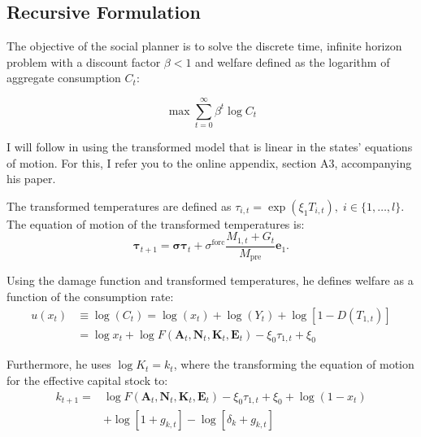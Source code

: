 \subsection{Recursive Formulation}
\label{subsec:recursive formulation}

The objective of the social planner is to solve the discrete time, infinite horizon problem with a discount factor \(\beta < 1\) and welfare defined as the logarithm of aggregate consumption \(C_t\):

\begin{equation}
    \max \sum_{t=0}^\infty \beta^t \log C_t
\end{equation}

I will follow \textcite{TraegerChristian2023ACE} in using the transformed model that is linear in the states' equations of motion. For this, I refer you to the online appendix, section A3, accompanying his paper.

The transformed temperatures are defined as \(\tau_{i,t} = \exp(\xi_1 T_{i,t}), \; i \in \{1, \dots, l\}\). The equation of motion of the transformed temperatures is:
\begin{equation}
    \bm{\tau}_{t+1} = \bm{\sigma}\bm{\tau}_t + \sigma^{\text{forc}}\frac{M_{1,t}+G_t}{M_{\text{pre}}}\bm{e}_1 .
\end{equation}

Using the damage function and transformed temperatures, he defines welfare as a function of the consumption rate:
\begin{equation}
\begin{aligned}
    u(x_t) &\equiv \log(C_t) = \log(x_t) + \log(Y_t) + \log[1-D(T_{1,t})] \\
    &= \log x_t + \log F(\bm{A}_t,\bm{N}_t,\bm{K}_t,\bm{E}_t) - \xi_0\tau_{1,t} + \xi_0
\end{aligned}
\label{eq:utility_function_transformed}
\end{equation}

Furthermore, he uses \(\log K_t = k_t\), where the transforming the equation of motion for the effective capital stock to:
\begin{equation}
\begin{aligned}
    k_{t+1} = &\log F(\bm{A}_t,\bm{N}_t,\bm{K}_t,\bm{E}_t) - \xi_0\tau_{1,t} + \xi_0 + \log(1-x_t) \\
    & +\log[1+g_{k,t}] - \log[\delta_k + g_{k,t}]
\end{aligned}
\label{eq:capital_transformed}
\end{equation}


